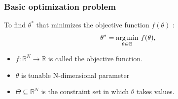 



%
%


\begin{frame}
\frametitle{\centering Basic optimization problem}
\begin{block}{}
\begin{small}
To find $\theta^{*}$ that minimizes the objective function $f(\theta)$ :
\begin{align}\label{eq:opt}
 \theta^* = \underset{\theta \in \Theta}{\mathop{\rm arg\,min}} ~f(\theta),
\end{align}
\end{small}
\end{block}
\begin{small}
\begin{itemize}
\item $f \colon \mathbb{R}^N \to \mathbb{R}$ is called the objective function.
\item $\theta$ is tunable N-dimensional parameter
\item $\Theta \subseteq \mathbb{R}^N$ is the constraint set in which $\theta$ takes values.
\end{itemize}
\end{small}
\end{frame}

